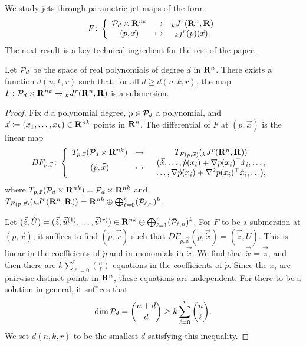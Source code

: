 We study jets through parametric jet maps of the form
\begin{equation}
\label{E!E:jet-map}
  F \colon \left\{
  \begin{array}{ccc}
    \mathcal{P}_d \times \mathbf{R}^{nk} & \to & {}_k J^r(\mathbf{R}^n, \mathbf{R}) \\
    (p, \vec{x}) & \mapsto & {}_k j^r(p)(\vec x).
  \end{array}
  \right.
\end{equation}
The next result is a key technical ingredient for the rest of the paper.

\begin{theorem}
\label{E!T:submersion}
  Let $\mathcal{P}_d$ be the space of real polynomials of degree $d$ in $\mathbf{R}^n$. There exists a function $d(n, k, r)$ such that, for all $d \geq d(n, k, r)$, the map $F \colon \mathcal{P}_d \times \mathbf{R}^{nk} \to {}_k J^r(\mathbf{R}^n, \mathbf{R})$ is a submersion.
\end{theorem}

\begin{proof}
  Fix $d$ a polynomial degree, $p \in \mathcal{P}_d$ a polynomial, and $\vec{x} \coloneq (x_1, \ldots, x_k) \in \mathbf{R}^{nk}$ points in $\mathbf{R}^n$. The differential of $F$ at $(p, \vec{x})$ is the linear map
  \[
    DF_{p, \vec{x}} \colon \left\{
    \begin{array}{ccc}
      T_{p, \vec{x}} (\mathcal{P}_d \times \mathbf{R}^{nk})
      & \to
      & T_{F(p, \vec{x})} ({}_k J^r(\mathbf{R}^n, \mathbf{R}))
    \\
      (\dot{p}, \vec{\dot{x}})
      & \mapsto
      & \begin{array}{c}
        (\vec{\dot{x}}, \ldots, \dot{p}(x_i) + \nabla p(x_i)^\top \dot{x}_i, \ldots, \\
        \ldots, \nabla \dot{p}(x_i) + \nabla^2 p(x_i)^\top \dot{x}_i, \ldots),
      \end{array}
    \end{array}
    \right.
  \]
  where $T_{p, \vec{x}} (\mathcal{P}_d \times \mathbf{R}^{nk}) = \mathcal{P}_d \times \mathbf{R}^{nk}$ and $T_{F(p, \vec{x})} ({}_k J^r(\mathbf{R}^n, \mathbf{R})) = \mathbf{R}^{nk} \oplus \bigoplus_{\ell = 0}^r (\mathcal{P}_{\ell, n})^k$.

  Let $(\vec{\dot{z}}, \dot{U}) = (\vec{\dot{z}}, \vec{\dot{u}}^{(1)}, \ldots, \vec{\dot{u}}^{(r)}) \in \mathbf{R}^{nk} \oplus \bigoplus_{\ell = 1}^r (\mathcal{P}_{\ell, n})^k$. For $F$ to be a submersion at $(p, \vec{x})$, it suffices to find $(\dot{p}, \vec{\dot{x}})$ such that $DF_{p, \vec{x}}(\dot{p}, \vec{\dot{x}}) = (\vec{\dot{z}}, \dot{U})$. This is linear in the coefficients of $\dot{p}$ and in monomials in $\vec{\dot{x}}$. We find that $\vec{\dot{x}} = \vec{\dot{z}}$, and then there are $k \sum_{\ell = 0}^r \binom{n}{\ell}$ equations in the coefficients of $\dot{p}$. Since the $x_i$ are pairwise distinct points in $\mathbf{R}^n$, these equations are independent. For there to be a solution in general, it suffices that
  \[
    \dim \mathcal{P}_d = \binom{n + d}{d} \geq k \sum_{\ell = 0}^r \binom{n}{\ell}.
  \]
  We set $d(n, k, r)$ to be the smallest $d$ satisfying this inequality.
\end{proof}

